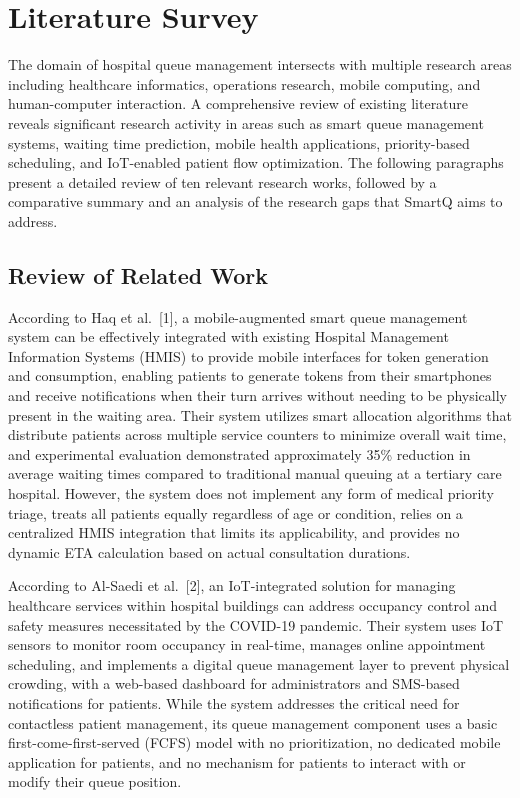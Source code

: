 \documentclass[12pt,a4paper]{article}
\begin{document}
\section{Literature Survey}

The domain of hospital queue management intersects with multiple research areas including healthcare informatics, operations research, mobile computing, and human-computer interaction. A comprehensive review of existing literature reveals significant research activity in areas such as smart queue management systems, waiting time prediction, mobile health applications, priority-based scheduling, and IoT-enabled patient flow optimization. The following paragraphs present a detailed review of ten relevant research works, followed by a comparative summary and an analysis of the research gaps that SmartQ aims to address.

\subsection{Review of Related Work}

According to Haq et al.~[1], a mobile-augmented smart queue management system can be effectively integrated with existing Hospital Management Information Systems (HMIS) to provide mobile interfaces for token generation and consumption, enabling patients to generate tokens from their smartphones and receive notifications when their turn arrives without needing to be physically present in the waiting area. Their system utilizes smart allocation algorithms that distribute patients across multiple service counters to minimize overall wait time, and experimental evaluation demonstrated approximately 35\% reduction in average waiting times compared to traditional manual queuing at a tertiary care hospital. However, the system does not implement any form of medical priority triage, treats all patients equally regardless of age or condition, relies on a centralized HMIS integration that limits its applicability, and provides no dynamic ETA calculation based on actual consultation durations.

According to Al-Saedi et al.~[2], an IoT-integrated solution for managing healthcare services within hospital buildings can address occupancy control and safety measures necessitated by the COVID-19 pandemic. Their system uses IoT sensors to monitor room occupancy in real-time, manages online appointment scheduling, and implements a digital queue management layer to prevent physical crowding, with a web-based dashboard for administrators and SMS-based notifications for patients. While the system addresses the critical need for contactless patient management, its queue management component uses a basic first-come-first-served (FCFS) model with no prioritization, no dedicated mobile application for patients, and no mechanism for patients to interact with or modify their queue position.
\end{document}
